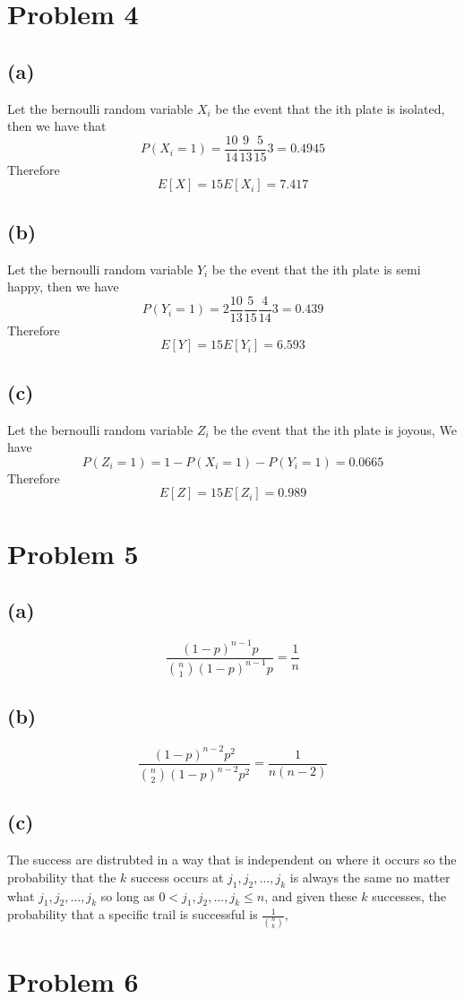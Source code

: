 \section*{Problem 4}
\subsection*{(a)}
Let the bernoulli random variable $X_i$ be the event 
that the ith plate is isolated, then we have that 
$$P(X_i=1)=\frac{10}{14}\frac{9}{13}\frac{5}{15}3=0.4945$$
Therefore 
$$E[X]=15E[X_i]=\boxed{7.417}$$
\subsection*{(b)}
Let the bernoulli random variable $Y_i$ be the event
that the ith plate is semi happy, then we have
$$P(Y_i=1)=2\frac{10}{13}\frac{5}{15}\frac{4}{14}3=0.439$$
Therefore
$$E[Y]=15E[Y_i]=\boxed{6.593}$$
\subsection*{(c)}
Let the bernoulli random variable $Z_i$ be the event
that the ith plate is joyous, We have
$$P(Z_i=1)=1-P(X_i=1)-P(Y_i=1)=0.0665$$
Therefore
$$E[Z]=15E[Z_i]=\boxed{0.989}$$
\section*{Problem 5}
\subsection*{(a)}
$$\frac{(1-p)^{n-1}p}{{n\choose 1}(1-p)^{n-1}p}=\boxed{\frac{1}{n}}$$
\subsection*{(b)}
$$\frac{(1-p)^{n-2}p^2}{{n\choose 2}(1-p)^{n-2}p^2}=\boxed{\frac{1}{n(n-2)}}$$
\subsection*{(c)}
The success are distrubted in a way that
is independent on where it occurs so 
the probability that the $k$ success occurs at 
$j_1,j_2,\dots,j_k$ is always the same no matter what
$j_1,j_2,\dots,j_k$ so long as $0<j_1,j_2,\dots,j_k\leq n$,
and given these $k$ successes, the probability
that a specific trail is successful is $\frac{1}{{n\choose k}}$,
\section*{Problem 6}
